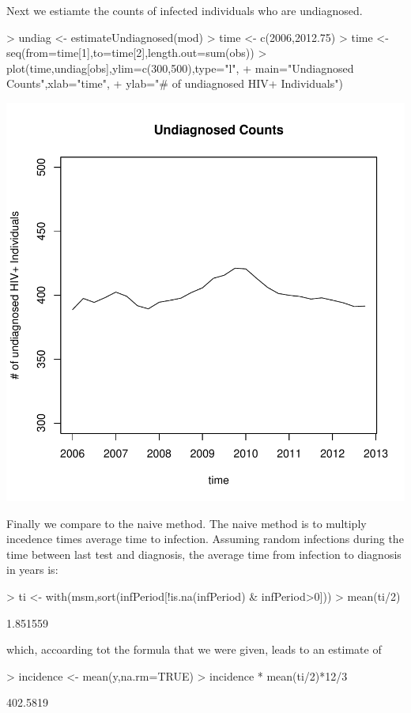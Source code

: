 \documentclass{article}
\begin{document}
Next we estiamte the counts of infected individuals who are undiagnosed.
\begin{Schunk}
\begin{Sinput}
> undiag <- estimateUndiagnosed(mod)
> time <- c(2006,2012.75)
> time <- seq(from=time[1],to=time[2],length.out=sum(obs))
> plot(time,undiag[obs],ylim=c(300,500),type="l",
+      main="Undiagnosed Counts",xlab="time",
+      ylab="# of undiagnosed HIV+ Individuals")
\end{Sinput}
\end{Schunk}
\includegraphics{analysis-003}

Finally we compare to the naive method. The naive method is to multiply incedence times average time to infection. Assuming random infections during the time between last test and diagnosis, the average time from infection to diagnosis in years is:
\begin{Schunk}
\begin{Sinput}
> ti <- with(msm,sort(infPeriod[!is.na(infPeriod) & infPeriod>0]))
> mean(ti/2)
\end{Sinput}
\begin{Soutput}
[1] 1.851559
\end{Soutput}
\end{Schunk}
which, accoarding tot the formula that we were given, leads to an estimate of
\begin{Schunk}
\begin{Sinput}
> incidence <- mean(y,na.rm=TRUE)
> incidence * mean(ti/2)*12/3
\end{Sinput}
\begin{Soutput}
[1] 402.5819
\end{Soutput}
\end{Schunk}
\end{document}
